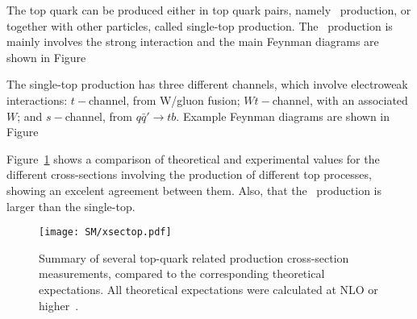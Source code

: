 The top quark can be produced either in top quark pairs, namely \ttbar\ production, or together with other particles, called single-top production. The \ttbar\ production is mainly involves the strong interaction and the main Feynman diagrams are shown in Figure%


The single-top production has three different channels, which involve electroweak interactions: $t-$channel, from W/gluon fusion; $Wt-$channel, with an associated $W$; and $s-$channel, from $q\bar{q}'\to tb$. Example Feynman diagrams are shown in Figure%


Figure~\ref{figSM:topcrossection} shows a comparison of theoretical and experimental values for the different cross-sections involving the production of different top processes, showing an excelent agreement between them. Also, that the \ttbar\ production is larger than the single-top.

\begin{figure}[htbp]
    \RawFloats
    \begin{center}
    \texttt{[image: SM/xsectop.pdf]}
    \caption{
        Summary of several top-quark related production cross-section measurements, compared to the corresponding theoretical expectations. All theoretical expectations were calculated at NLO or higher~\cite{ATL-PHYS-PUB-2022-031}.
    }
    \label{figSM:topcrossection}
    \end{center}
\end{figure}

